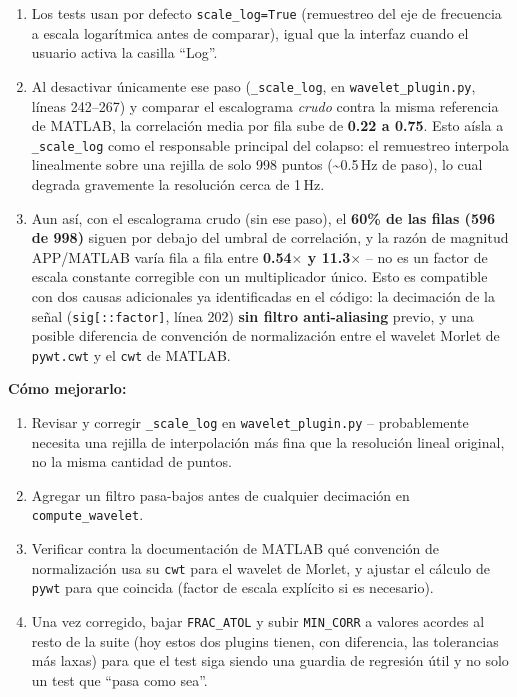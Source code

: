 \documentclass[11pt,a4paper]{article}
\begin{document}
\begin{enumerate}
  \item Los tests usan por defecto \texttt{scale\_\allowbreak log=True} (remuestreo del eje de frecuencia a escala
        logarítmica antes de comparar), igual que la interfaz cuando el usuario activa la casilla ``Log''.
  \item Al desactivar únicamente ese paso (\texttt{\_\allowbreak scale\_\allowbreak log}, en
        \texttt{wavelet\_\allowbreak plugin.py}, líneas 242--267) y comparar el escalograma \emph{crudo} contra la misma
        referencia de MATLAB, la correlación media por fila sube de \textbf{0.22 a 0.75}. Esto aísla a
        \texttt{\_\allowbreak scale\_\allowbreak log} como el responsable principal del colapso: el remuestreo interpola
        linealmente sobre una rejilla de solo 998 puntos (\textasciitilde0.5\,Hz de paso), lo cual degrada
        gravemente la resolución cerca de 1\,Hz.
  \item Aun así, con el escalograma crudo (sin ese paso), el \textbf{60\% de las filas (596 de 998)} siguen
        por debajo del umbral de correlación, y la razón de magnitud APP/MATLAB varía fila a fila entre
        \textbf{0.54$\times$ y 11.3$\times$} -- no es un factor de escala constante corregible con un
        multiplicador único. Esto es compatible con dos causas adicionales ya identificadas en el código:
        la decimación de la señal (\texttt{sig[::factor]}, línea 202) \textbf{sin filtro anti-aliasing}
        previo, y una posible diferencia de convención de normalización entre el wavelet Morlet de
        \texttt{pywt.cwt} y el \texttt{cwt} de MATLAB.
\end{enumerate}

\textbf{Cómo mejorarlo:}
\begin{enumerate}
  \item Revisar y corregir \texttt{\_\allowbreak scale\_\allowbreak log} en \texttt{wavelet\_\allowbreak plugin.py} -- probablemente necesita una
        rejilla de interpolación más fina que la resolución lineal original, no la misma cantidad de puntos.
  \item Agregar un filtro pasa-bajos antes de cualquier decimación en \texttt{compute\_\allowbreak wavelet}.
  \item Verificar contra la documentación de MATLAB qué convención de normalización usa su \texttt{cwt} para
        el wavelet de Morlet, y ajustar el cálculo de \texttt{pywt} para que coincida (factor de escala
        explícito si es necesario).
  \item Una vez corregido, bajar \texttt{FRAC\_\allowbreak ATOL} y subir \texttt{MIN\_\allowbreak CORR} a valores acordes al resto de
        la suite (hoy estos dos plugins tienen, con diferencia, las tolerancias más laxas) para que el test
        siga siendo una guardia de regresión útil y no solo un test que ``pasa como sea''.
\end{enumerate}
\end{document}
